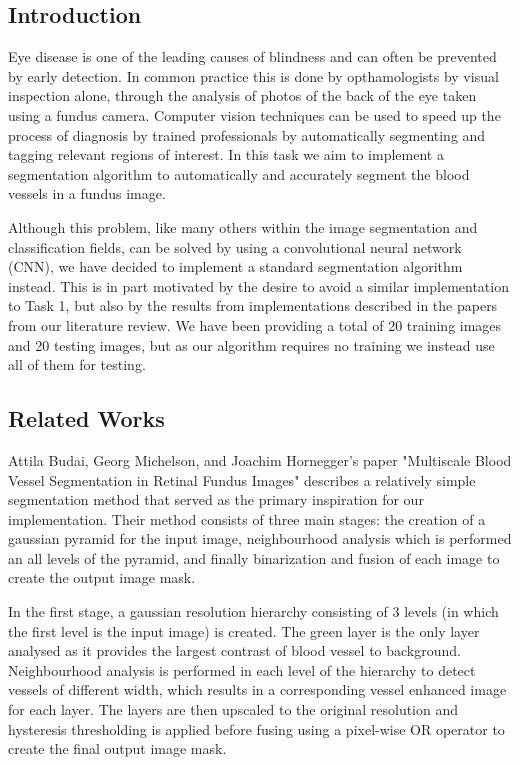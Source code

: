 \documentclass[conference]{IEEEtran}
\begin{document}
\subsection{Introduction}
\par
Eye disease is one of the leading causes of blindness and can often be prevented by early detection. In common practice this is done by opthamologists by visual inspection alone, through the analysis of photos of the back of the eye taken using a fundus camera. Computer vision techniques can be used to speed up the process of diagnosis by trained professionals by automatically segmenting and tagging relevant regions of interest. In this task we aim to implement a segmentation algorithm to automatically and accurately segment the blood vessels in a fundus image.
\par
Although this problem, like many others within the image segmentation and classification fields, can be solved by using a convolutional neural network (CNN), we have decided to implement a standard segmentation algorithm instead. This is in part motivated by the desire to avoid a similar implementation to Task 1, but also by the results from implementations described in the papers from our literature review. We have been providing a total of 20 training images and 20 testing images, but as our algorithm requires no training we instead use all of them for testing.

\subsection{Related Works}
\par
Attila Budai, Georg Michelson, and Joachim Hornegger's paper "Multiscale Blood Vessel Segmentation in Retinal Fundus Images" \cite{21} describes a relatively simple segmentation method that served as the primary inspiration for our implementation. Their method consists of three main stages: the creation of a gaussian pyramid for the input image, neighbourhood analysis which is performed an all levels of the pyramid, and finally binarization and fusion of each image to create the output image mask.
\par

In the first stage, a gaussian resolution hierarchy consisting of 3 levels (in which the first level is the input image) is created. The green layer is the only layer analysed as it provides the largest contrast of blood vessel to background. Neighbourhood analysis is performed in each level of the hierarchy to detect vessels of different width, which results in a corresponding vessel enhanced image for each layer. The layers are then upscaled to the original resolution and hysteresis thresholding is applied before fusing using a pixel-wise OR operator to create the final output image mask.
\end{document}

